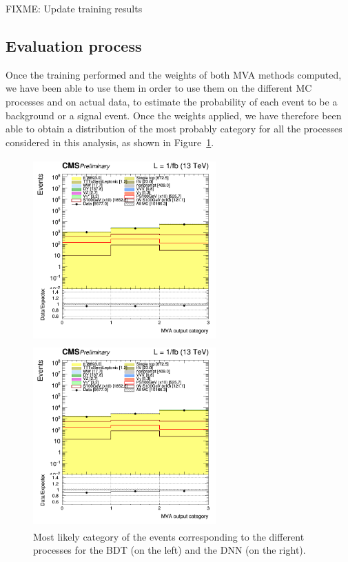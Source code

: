 \documentclass[a4paper, 10pt, openright]{report}
\begin{document}
\color{red}FIXME: Update training results \color{black}

\subsection{Evaluation process}

Once the training performed and the weights of both \ac{MVA} methods computed, we have been able to use them in order to use them on the different \ac{MC} processes and on actual data, to estimate the probability of each event to be a background or a signal event. Once the weights applied, we have therefore been able to obtain a distribution of the most probably category for all the processes considered in this analysis, as shown in Figure~\ref{fig:weightsApplied}.

\begin{figure}[htbp]
\centering
\begin{minipage}[b]{.49\textwidth}
\includegraphics[width=7cm, height=7cm]{figs/log_cratio_topCR_ll_2j_BDT_category.png}
\end{minipage}\hfill
\begin{minipage}[b]{.49\textwidth}
\includegraphics[width=7cm, height=7cm]{figs/log_cratio_topCR_ll_2j_DNN_category.png}
\end{minipage} \hfill
\caption{Most likely category of the events corresponding to the different processes for the \ac{BDT} (on the left) and the \ac{DNN} (on the right).}
\label{fig:weightsApplied}
\end{figure}
\end{document}
